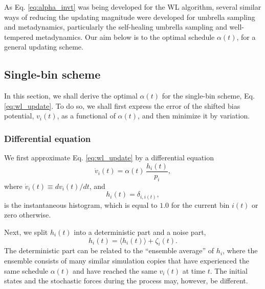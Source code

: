 \documentclass[reprint, floatfix]{revtex4-1}
\begin{document}
As Eq. \eqref{eq:alpha_invt} was being developed for the WL algorithm,
several similar ways of
reducing the updating magnitude
were developed for umbrella sampling and metadynamics,
particularly the
self-healing umbrella sampling
and well-tempered metadynamics\cite{
  marsili2006, barducci2008, dickson2011, dama2014}.
%
Our aim below is to the optimal schedule $\alpha(t)$,
for a general updating scheme.




\subsection{\label{sec:single-bin}
Single-bin scheme}



In this section,
we shall derive the optimal $\alpha(t)$
for the single-bin scheme,
Eq. \eqref{eq:wl_update}.
%
To do so,
we shall first express the error of
the shifted bias potential, $v_i(t)$,
as a functional of $\alpha(t)$,
and then minimize it by variation.



\subsubsection{Differential equation}



We first approximate Eq. \eqref{eq:wl_update}
by a differential equation
%
\begin{equation}
  \dot v_i(t)
  =
  \alpha(t) \, \frac{ h_i(t) } { p_i },
  \label{eq:vt_diffeq}
\end{equation}
%
where
$\dot v_i(t) \equiv dv_i(t)/dt$,
%
and
\begin{equation}
  h_i(t) = \delta_{i, i(t)}
  ,
  \label{eq:h_def}
\end{equation}
is the instantaneous histogram,
which is equal to $1.0$
for the current bin $i(t)$
or zero otherwise.



Next, we split $h_i(t)$ into a deterministic part
and a noise part,
%
\begin{equation}
  h_i(t) = \langle h_i(t) \rangle + \zeta_i(t).
  \label{eq:h_split}
\end{equation}
%
The deterministic part can be related
to the ``ensemble average'' of $h_i$,
where the ensemble consists of many similar simulation copies
that have experienced the same schedule $\alpha(t)$
and have reached the same $v_i(t)$
at time $t$.
%
The initial states and the stochastic forces
during the process may, however, be different.
\end{document}
